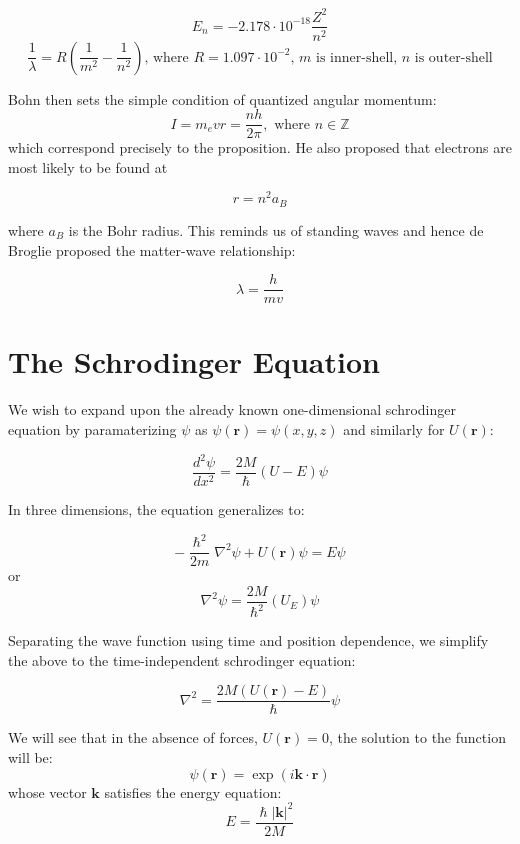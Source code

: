 \documentclass[11pt,fleqn]{book}
\begin{document}
\begin{descriptions}
\begin{itemize}
    \end{itemize}
    \begin{proposition}
        $$E_n=-2.178\cdot10^{-18}\frac{Z^2}{n^2}$$
        $$\frac{1}{\lambda}=R\left(\frac{1}{m^2}-\frac{1}{n^2}\right)\text{, where 
 }R=1.097\cdot10^{-2}\text{, $m$ is inner-shell, $n$ is outer-shell}$$
    \end{proposition}
    Bohn then sets the simple condition of quantized angular momentum:
    \[
    I=m_evr=\frac{nh}{2\pi},\text{ where }n\in \mathbb{Z}
    \]
    which correspond precisely to the proposition. He also proposed that electrons are most likely to be found at 
    \begin{proposition}
        $$r=n^2a_B$$
    \end{proposition}
    where $a_B$ is the Bohr radius. This reminds us of standing waves and hence de Broglie proposed the matter-wave relationship:
    \begin{theorem}
        $$\lambda=\frac{h}{mv}$$
    \end{theorem}
\end{descriptions}

\section{The Schrodinger Equation}
We wish to expand upon the already known one-dimensional schrodinger equation by paramaterizing $\psi$ as $\psi(\mathbf{r})=\psi(x,y,z)$ and similarly for $U(\mathbf{r})$:
\begin{theorem}
    $$\frac{d^2\psi}{dx^2}=\frac{2M}{\hslash}(U-E)\psi$$
\end{theorem}
In three dimensions, the equation generalizes to:
\begin{theorem}
    $$-\frac{\hslash^2}{2m} \nabla^2 \psi + U(\mathbf{r}) \psi = E \psi$$
    or
    $$\nabla^2\psi=\frac{2M}{\hslash^2}(U_E)\psi$$
\end{theorem}
Separating the wave function using time and position dependence, we simplify the above to the time-independent schrodinger equation:
\begin{theorem}
    $$\nabla^2=\frac{2M(U(\mathbf{r})-E)}{\hslash}\psi$$
\end{theorem}
We will see that in the absence of forces, $U(\mathbf{r})=0$, the solution to the function will be:
$$\psi(\mathbf{r})=\exp(i\mathbf{k}\cdot\mathbf{r})$$
whose vector $\mathbf{k}$ satisfies the energy equation: 
$$E=\frac{\hslash|\mathbf{k}|^2}{2M}$$
\end{document}
